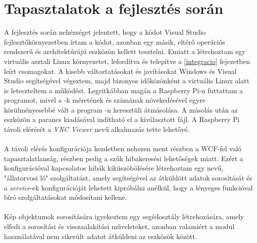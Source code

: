 \section{Tapasztalatok a fejlesztés során}
A fejlesztés során nehézséget jelentett, hogy a kódot Visual Studio fejlesztőkörnyezetben írtam a kódot, azonban egy másik, eltérő operációs rendszerű és architektúrájú eszközön kellett tesztelni. Emiatt a létrehoztam egy virtuális asztali Linux környezetet, lefordítva és telepítve a \ref{integracio} fejezetben leírt csomagokat. A kisebb változtatásokat és javításokat Windows és Visual Studio segítségével végeztem, majd bizonyos időközönként a virtuális Linux alatt is leteszteltem a működést. Legritkábban magán a Raspberry Pi-n futtattam a programot, mivel a -k méretének és számának növekedésével egyre körülményesebbé vált a program -n keresztüli átmásolása. A másolás után az eszközön a  parancs kiadásával indítható el a kiválasztott  fájl. A Raspberry Pi távoli elérését a \textit{VNC Viewer} nevű alkalmazás tette lehetővé.\\
\\
A távoli elérés konfigurációja kezdetben nehezen ment részben a WCF-fel való tapasztalatlanság, részben pedig a szűk hibakeresési lehetőségek miatt. Ezért a konfigurációval kapcsolatos hibák kiküszöbölésére létrehoztam egy  nevű, "állatorvosi ló" szolgáltatást, amely segítségével az átküldött adatok sorosítását és a \textit{service}-ek konfigurációját lehetett kipróbálni anélkül, hogy a lényeges funkcióval bíró szolgáltatásokat módosítani kellene.\\
\\
Kép objektumok sorosítására igyekeztem egy segédosztály létrehozására, amely elfedi a sorosítási és visszaalakítási műveleteket, azonban valamiért a modul használatával nem sikerült adatot átküldeni az eszközök között.
